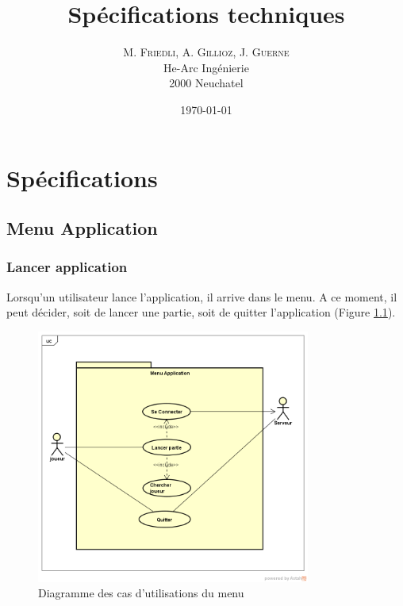 \documentclass{report}
\title{Spécifications techniques}
\author{M. \textsc{Friedli}, A. \textsc{Gillioz}, J. \textsc{Guerne}\\
He-Arc Ingénierie\\
2000 Neuchatel}
\date{\today{}}
\begin{document}
\maketitle{}
\chapter{Spécifications}
\section{Menu Application}
\subsection{Lancer application}
Lorsqu'un utilisateur lance l'application, il arrive dans le menu. A ce moment, il peut décider, soit de lancer une partie, soit de quitter l'application (Figure \ref{diagramme-mainApp}).
\begin{figure}[ht]
	\centering\includegraphics[width=9cm]{menuApplication}
	\caption{Diagramme des cas d'utilisations du menu}
	\label{diagramme-mainApp}
\end{figure}
\end{document}
